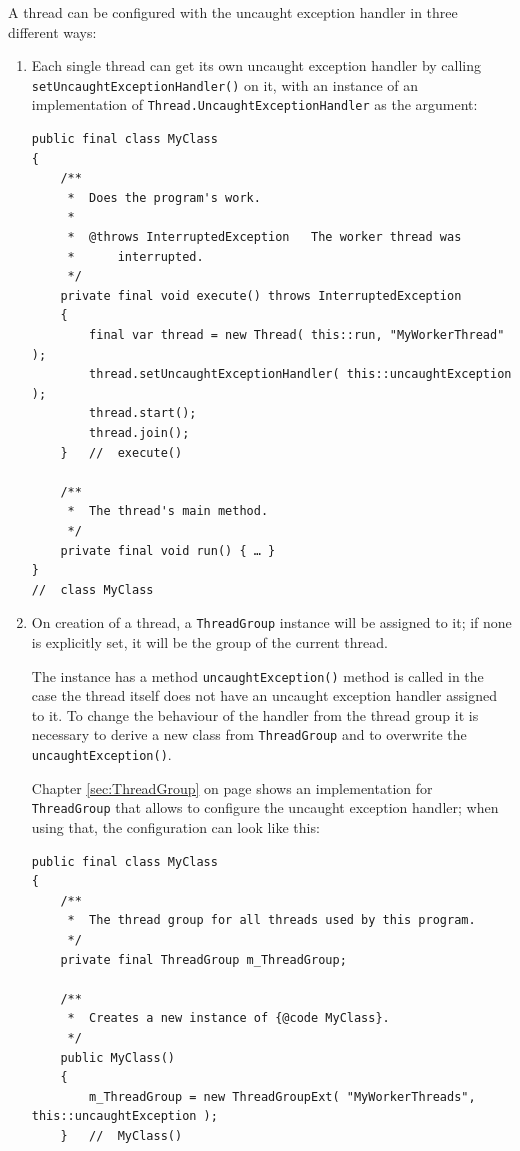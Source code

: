 \documentclass[11pt,a4paper, titlepage, parskip=half, headsepline, footsepline, cleardoublepage=current, headheight=1cm]{scrbook}
\newcommand*{\tqvref}[1]{\hyperref[{#1}]{\ref*{#1}} on page \pageref{#1}}
\begin{document}
A thread can be configured with the uncaught exception handler in three different ways:
\begin{enumerate}
\item{Each single thread can get its own uncaught exception handler by calling \lstinline|setUncaughtExceptionHandler()|\autocite{ORACLE_DOC_THREAD:setUncaughtExceptionHandler} on it, with an instance of an implementation of \lstinline|Thread.UncaughtExceptionHandler| as the argument:
\begin{lstlisting}
public final class MyClass
{
    /**
     *  Does the program's work.
     *
     *  @throws InterruptedException   The worker thread was
     *      interrupted.
     */
    private final void execute() throws InterruptedException
    {
        final var thread = new Thread( this::run, "MyWorkerThread" );
        thread.setUncaughtExceptionHandler( this::uncaughtException );
        thread.start();
        thread.join();
    }   //  execute()
     
    /**
     *  The thread's main method.
     */
    private final void run() { … }
}
//  class MyClass
\end{lstlisting}
}
\item{On creation of a thread, a \lstinline|ThreadGroup|\autocite{ORACLE_DOC_THREADGROUP_CLASS} instance will be assigned to it; if none is explicitly set, it will be the group of the current thread.

The instance has a method \lstinline|uncaughtException()|\autocite{ORACLE_DOC_THREADGROUP:uncaughtException} method is called in the case the thread itself does not have an uncaught exception handler assigned to it. To change the behaviour of the handler from the thread group it is necessary to derive a new class from \lstinline|ThreadGroup| and to overwrite the \lstinline|uncaughtException()|.

Chapter \tqvref{sec:ThreadGroup} shows an implementation for \lstinline|ThreadGroup| that allows to configure the uncaught exception handler; when using that, the configuration can look like this:
\begin{lstlisting}
public final class MyClass
{
    /**
     *  The thread group for all threads used by this program.
     */
    private final ThreadGroup m_ThreadGroup;
    
    /**
     *  Creates a new instance of {@code MyClass}.
     */
    public MyClass()
    {
        m_ThreadGroup = new ThreadGroupExt( "MyWorkerThreads", this::uncaughtException );
    }   //  MyClass()
    

\end{lstlisting}}
\end{enumerate}
\end{document}
